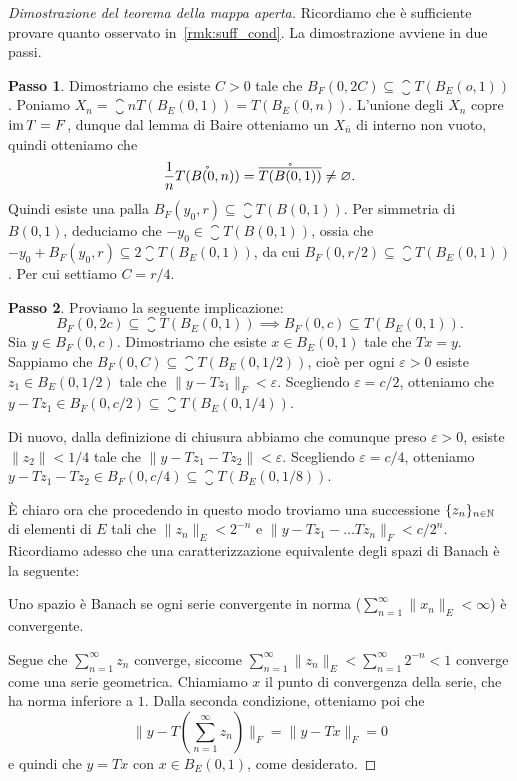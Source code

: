 \begin{proof}[Dimostrazione del teorema della mappa aperta]
	Ricordiamo che è sufficiente provare quanto osservato in~\ref{rmk:suff_cond}. La dimostrazione avviene in due passi.

	\textbf{Passo 1}. Dimostriamo che esiste $C>0$ tale che $B_F(0, 2C) \subseteq \closure{T(B_E(o, 1))}$.
	Poniamo $X_n = \closure{n T(B_E(0,1))} = T(B_E(0,n))$. L'unione degli $X_n$ copre $\operatorname{im} T = F$, dunque dal lemma di Baire otteniamo un $X_{\bar n}$ di interno non vuoto, quindi otteniamo che
	\begin{equation*}
		\frac1n \mathring{T(B(0,n))} = \mathring{\overline{T(B(0,1))}} \neq \varnothing.
	\end{equation*}
	Quindi esiste una palla $B_F(y_0, r) \subseteq \closure{T(B(0,1))}$. Per simmetria di $B(0,1)$, deduciamo che $-y_0 \in \closure{T(B(0,1))}$, ossia che $-y_0 + B_F(y_0, r) \subseteq 2\closure{T(B_E(0,1))}$, da cui $B_F(0, r/2) \subseteq \closure{T(B_E(0,1))}$. Per cui settiamo $C = r/4$.

	\textbf{Passo 2}. Proviamo la seguente implicazione:
	\begin{equation*}
		B_F(0,2c) \subseteq \closure{T(B_E(0,1))} \implies B_F(0, c) \subseteq T(B_E(0,1)).
	\end{equation*}
 	Sia $y \in B_F(0,c)$. Dimostriamo che esiste $x \in B_E(0,1)$ tale che $Tx = y$. Sappiamo che $B_F(0, C) \subseteq \closure{T(B_E(0,1/2))}$, cioè per ogni $\varepsilon > 0$ esiste $z_1 \in B_E(0,1/2)$ tale che $\|y - Tz_1\|_F < \varepsilon$. Scegliendo $\varepsilon = c/2$, otteniamo che $y-Tz_1 \in B_F(0, c/2) \subseteq \closure{T(B_E(0,1/4))}$.

	Di nuovo, dalla definizione di chiusura abbiamo che comunque preso $\varepsilon > 0$, esiste $\|z_2\| < 1/4$ tale che $\|y - Tz_1 - Tz_2\| < \varepsilon$. Scegliendo $\varepsilon = c/4$, otteniamo $y - Tz_1 - Tz_2 \in B_F(0,c/4) \subseteq \closure{T(B_E(0,1/8))}$.

	È chiaro ora che procedendo in questo modo troviamo una successione $\{z_n\}_{n \in \mathbb{N}}$ di elementi di $E$ tali che $\|z_n\|_E < 2^{-n}$ e $\|y- Tz_1 - \ldots Tz_n\|_F < c/2^n$. Ricordiamo adesso che una caratterizzazione equivalente degli spazi di Banach è la seguente:
	\begin{center}
		Uno spazio è Banach se ogni serie convergente in norma ($\sum_{n=1}^\infty \|x_n\|_E < \infty$) è convergente.
	\end{center}
	Segue che $\sum_{n=1}^\infty z_n$ converge, siccome $\sum_{n=1}^\infty \|z_n\|_E < \sum_{n=1}^\infty 2^{-n} < 1$ converge come una serie geometrica. Chiamiamo $x$ il punto di convergenza della serie, che ha norma inferiore a $1$. Dalla seconda condizione, otteniamo poi che
	\begin{equation*}
		\|y - T(\sum_{n=1}^\infty z_n)\|_F = \|y - Tx\|_F = 0
	\end{equation*}
	e quindi che $y = Tx$ con $x \in B_E(0,1)$, come desiderato.
\end{proof}


